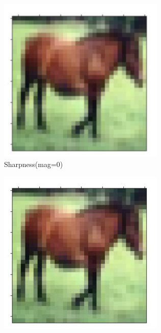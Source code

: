 \documentclass[onecolumn]{ujarticle}   %
\begin{document}
    \begin{figure}[h]
      \vspace{-4mm}
      \centering

      \begin{subfigure}{0.3\columnwidth}
        \centering
        \includegraphics[width=1.0\columnwidth]{transform_test/Sharpness_0.png}
        \caption{Sharpness(mag=0)}
        \label{fig:Sharpness_0}
      \end{subfigure}
      \begin{subfigure}{0.3\columnwidth}
        \centering
        \includegraphics[width=1.0\columnwidth]{transform_test/Sharpness_15.png}

\end{subfigure}
\end{figure}
\end{document}
